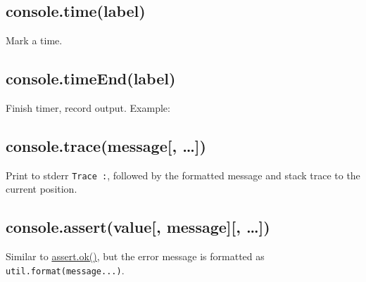 \subsection{console.time(label)}\label{console.timelabel}

Mark a time.

\subsection{console.timeEnd(label)}\label{console.timeendlabel}

Finish timer, record output. Example:

\begin{Shaded}
\begin{Highlighting}[]
\NormalTok{(}\NormalTok{);}
 \NormalTok{(} 
  \NormalTok{;}
\NormalTok{\}}
\NormalTok{(}\NormalTok{);}
\end{Highlighting}
\end{Shaded}

\subsection{console.trace(message{[},
\ldots{}{]})}\label{console.tracemessage}

Print to stderr \texttt{\textquotesingle{}Trace\ :\textquotesingle{}},
followed by the formatted message and stack trace to the current
position.

\subsection{console.assert(value{[}, message{]}{[},
\ldots{}{]})}\label{console.assertvalue-message}

Similar to
\href{assert.html\#assert_assert_value_message_assert_ok_value_message}{assert.ok()},
but the error message is formatted as \texttt{util.format(message...)}.
